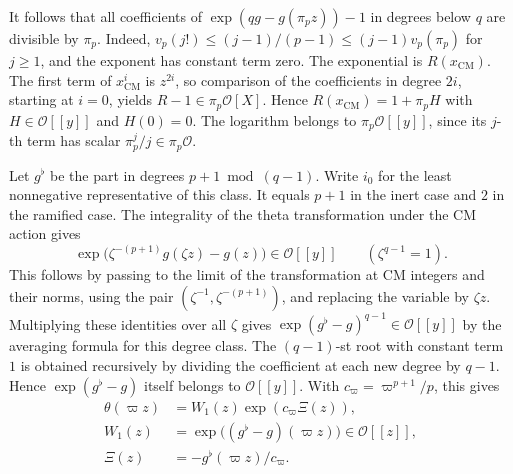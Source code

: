 It follows that all coefficients of \(\exp(qg-g(\pi_p z))-1\) in degrees
below \(q\) are divisible by \(\pi_p\). Indeed,
\(v_p(j!)\le(j-1)/(p-1)\le (j-1)v_p(\pi_p)\) for \(j\ge1\), and the
exponent has constant term zero. The exponential is \(R(x_\mathrm{CM})\).
The first term of \(x_\mathrm{CM}^i\) is \(z^{2i}\), so comparison of the
coefficients in degree \(2i\), starting at \(i=0\), yields
\(R-1\in\pi_p\mathcal O[X]\). Hence \(R(x_\mathrm{CM})=1+\pi_p H\) with
\(H\in\mathcal O[[y]]\) and \(H(0)=0\).
The logarithm belongs to \(\pi_p\mathcal O[[y]]\), since its \(j\)-th term
has scalar \(\pi_p^j/j\in\pi_p\mathcal O\).

Let \(g^\flat\) be the part in degrees \(p+1\bmod(q-1)\).
Write \(i_0\) for the least nonnegative representative of this class.
It equals \(p+1\) in the inert case and \(2\) in the ramified case.
The integrality of the theta transformation under the CM action gives
\[
 \exp\bigl(\zeta^{-(p+1)}g(\zeta z)-g(z)\bigr)\in\mathcal O[[y]]
 \qquad(\zeta^{q-1}=1).
\]
This follows by passing to the limit of the transformation at CM integers
and their norms, using the pair \((\zeta^{-1},\zeta^{-(p+1)})\), and
replacing the variable by \(\zeta z\).
Multiplying these identities over all \(\zeta\) gives
\(\exp(g^\flat-g)^{q-1}\in\mathcal O[[y]]\) by the averaging formula
for this degree class. The \((q-1)\)-st root with constant term \(1\)
is obtained recursively by dividing the coefficient at each new degree
by \(q-1\). Hence \(\exp(g^\flat-g)\) itself belongs to \(\mathcal O[[y]]\).
With \(c_\varpi=\varpi^{p+1}/p\), this gives
\begin{equation}\label{eq:upper-one-variable}
 \begin{aligned}
 \theta(\varpi z)&=W_1(z)\exp(c_\varpi\Xi(z)),\\
 W_1(z)&=\exp\bigl((g^\flat-g)(\varpi z)\bigr)\in\mathcal O[[z]],\\
 \Xi(z)&=-g^\flat(\varpi z)/c_\varpi .
 \end{aligned}
\end{equation}

